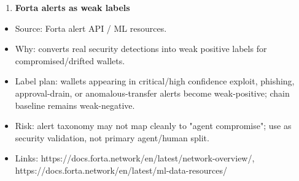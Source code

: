 \documentclass[11pt]{article}
\begin{document}
\begin{enumerate}
  \item \textbf{Forta alerts as weak labels}
\end{enumerate}
\begin{itemize}
  \item Source: Forta alert API / ML resources.
  \item Why: converts real security detections into weak positive labels for compromised/drifted wallets.
  \item Label plan: wallets appearing in critical/high confidence exploit, phishing, approval-drain, or anomalous-transfer alerts become weak-positive; chain baseline remains weak-negative.
  \item Risk: alert taxonomy may not map cleanly to "agent compromise"; use as security validation, not primary agent/human split.
  \item Links: https://docs.forta.network/en/latest/network-overview/, https://docs.forta.network/en/latest/ml-data-resources/
\end{itemize}
\end{document}
